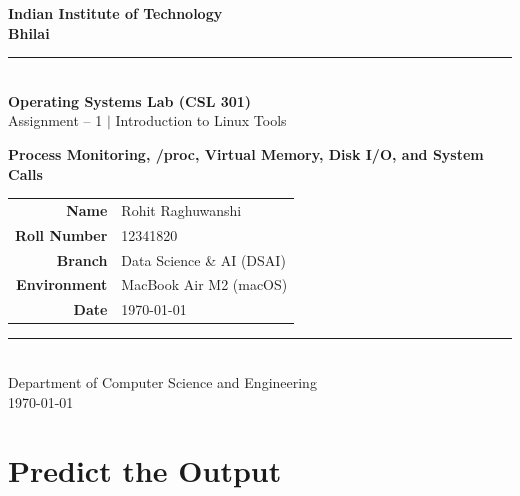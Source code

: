 \documentclass[12pt,a4paper]{article}
\begin{document}
\begin{titlepage}
  \centering
  \vspace*{1cm}
  
  {\LARGE\bfseries\color{iitbblue} Indian Institute of Technology\\[0.3cm] Bhilai}\\[0.5cm]
  \rule{0.8\textwidth}{0.5pt}\\[0.5cm]
  {\Large\bfseries Operating Systems Lab (CSL 301)}\\[0.3cm]
  {\large Assignment -- 1 $\mid$ Introduction to Linux Tools}\\[0.5cm]
  \begin{tcolorbox}[colback=white,colframe=iitbblue,width=0.8\textwidth,arc=6pt,boxrule=1.2pt]
    \centering
    {\large\bfseries Process Monitoring, /proc, Virtual Memory, Disk I/O, and System Calls}
  \end{tcolorbox}
  \vspace{1cm}
  \begin{tcolorbox}[colback=gray!5,colframe=iitbblue,width=0.67\textwidth,arc=4pt,boxrule=1pt]
    \begin{tabular}{rl}
      \textbf{Name}        & Rohit Raghuwanshi \\
      \textbf{Roll Number} & 12341820 \\
      \textbf{Branch}      & Data Science \& AI (DSAI) \\
      \textbf{Environment} & MacBook Air M2 (macOS) \\
      \textbf{Date}        & \today \\
    \end{tabular}
  \end{tcolorbox}
  \vfill
  \rule{0.8\textwidth}{0.5pt}\\[0.3cm]
  {\small Department of Computer Science and Engineering\\\today}
\end{titlepage}

\tableofcontents
\newpage

\section{Predict the Output}
\end{document}
